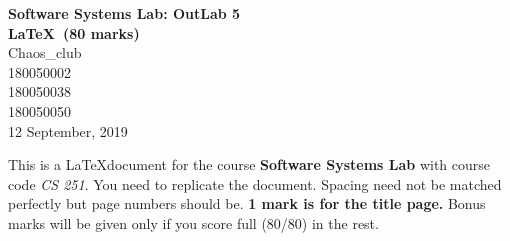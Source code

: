 \documentclass{article}
\begin{document}
\begin{titlepage}
    \begin{center}
     \vspace*{\fill}
     {\bfseries {\Huge {Software Systems Lab: OutLab 5\\
         \vspace{3mm}
         \LaTeX\ (80 marks)}}}\\%
     \vspace{10mm}
     {\huge Chaos\_club}\\
     \vspace{5mm}
     {\large {180050002 \\ 
         \vspace{1mm} 
         180050038 \\ 
         \vspace{1mm}
         180050050}}\\%
     \vspace{20mm}
     {\Large {12 September, 2019}}%
     \vspace*{\fill} 
    \end{center}
  \end{titlepage}
\newpage
\large{\tableofcontents}
\newpage

This is a \LaTeX{}document for the course \textbf{Software Systems Lab} with course code \textit{CS 251}. You need to replicate the document. Spacing need not be matched perfectly but page numbers should be. {\bfseries 1 mark is for the title page.} Bonus marks will be given only if you score full (80/80) in the rest.
\end{document}
